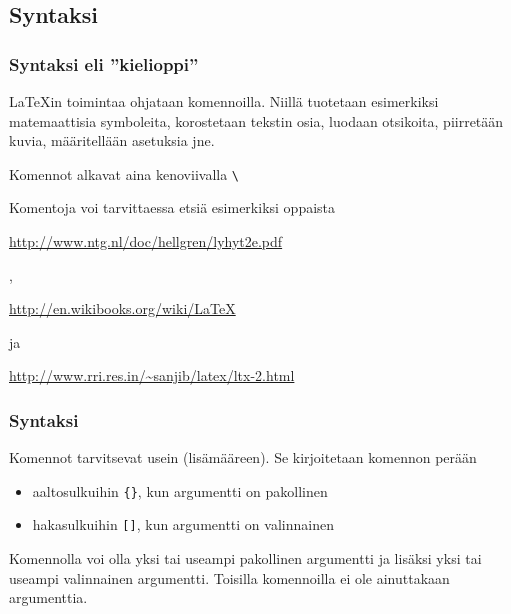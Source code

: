 \subsection{Syntaksi}
\begin{fframe}
    \frametitle{Syntaksi eli ''kielioppi''}
    \LaTeX in toimintaa ohjataan komennoilla. \pause Niillä tuotetaan esimerkiksi matemaattisia symboleita, korostetaan tekstin osia, luodaan otsikoita, piirretään kuvia, määritellään asetuksia jne.  \pause
    \begin{framed}
        Komennot alkavat aina kenoviivalla \lstinline-\-
    \end{framed}
    \pause
    Komentoja voi tarvittaessa etsiä esimerkiksi oppaista \begin{scriptsize}
        \url{http://www.ntg.nl/doc/hellgren/lyhyt2e.pdf}
    \end{scriptsize},
    \begin{scriptsize}
        \url{http://en.wikibooks.org/wiki/LaTeX}
    \end{scriptsize} ja
    \begin{scriptsize}
        \url{http://www.rri.res.in/~sanjib/latex/ltx-2.html}
    \end{scriptsize}
\end{fframe}


\begin{fframe}
    \frametitle{Syntaksi}
    Komennot tarvitsevat usein  (lisämääreen). \pause Se kirjoitetaan komennon perään
    \begin{itemize}[<+->]
        \item aaltosulkuihin \lstinline-{}-, kun argumentti on pakollinen
        \item hakasulkuihin \lstinline-[]-, kun argumentti on valinnainen
    \end{itemize}
    \pause
    Komennolla voi olla yksi tai useampi pakollinen argumentti ja lisäksi yksi tai useampi valinnainen argumentti. \pause Toisilla komennoilla ei ole ainuttakaan argumenttia.
\end{fframe}


